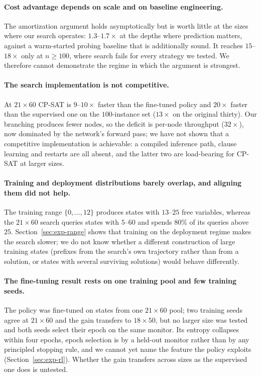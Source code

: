 \documentclass[preprint,12pt]{elsarticle}
\begin{document}
\paragraph{Cost advantage depends on scale and on baseline engineering.} The amortization argument holds asymptotically but is worth little at the sizes where our search operates: $1.3$--$1.7\times$ at the depths where prediction matters, against a warm-started probing baseline that is additionally sound. It reaches $15$--$18\times$ only at $n\ge 100$, where search fails for every strategy we tested. We therefore cannot demonstrate the regime in which the argument is strongest.

\paragraph{The search implementation is not competitive.} At $21\times60$ CP-SAT is $9$--$10\times$ faster than the fine-tuned policy and $20\times$ faster than the supervised one on the $100$-instance set ($13\times$ on the original thirty). Our branching produces fewer nodes, so the deficit is per-node throughput ($32\times$), now dominated by the network's forward pass; we have not shown that a competitive implementation is achievable: a compiled inference path, clause learning and restarts are all absent, and the latter two are load-bearing for CP-SAT at larger sizes.

\paragraph{Training and deployment distributions barely overlap, and aligning them did not help.} The training range $\{0,\dots,12\}$ produces states with $13$--$25$ free variables, whereas the $21\times60$ search queries states with $5$--$60$ and spends $80\%$ of its queries above $25$. Section~\ref{sec:exp-range} shows that training on the deployment regime makes the search slower; we do not know whether a different construction of large training states (prefixes from the search's own trajectory rather than from a solution, or states with several surviving solutions) would behave differently.

\paragraph{The fine-tuning result rests on one training pool and few training seeds.} The policy was fine-tuned on states from one $21\times60$ pool; two training seeds agree at $21\times60$ and the gain transfers to $18\times50$, but no larger size was tested and both seeds select their epoch on the same monitor. Its entropy collapses within four epochs, epoch selection is by a held-out monitor rather than by any principled stopping rule, and we cannot yet name the feature the policy exploits (Section~\ref{sec:exp-rl}). Whether the gain transfers across sizes as the supervised one does is untested.
\end{document}
